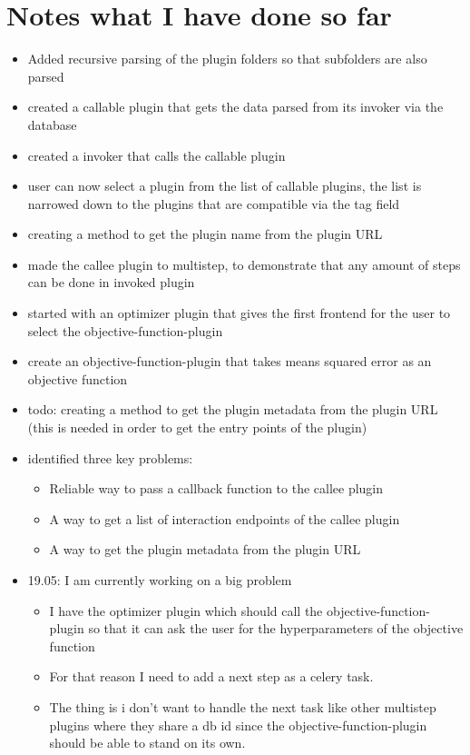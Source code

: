 \documentclass[
  a4paper,  %
  twoside,  %
  bibliography=totoc,
  headsepline,
  cleardoublepage=empty,
  parskip=half,
  draft=false
]{scrbook}
\begin{document}
\chapter{Notes what I have done so far}
\begin{itemize}
  \item Added recursive parsing of the plugin folders so that subfolders are also parsed
  \item created a callable plugin that gets the data parsed from its invoker via the database
  \item created a invoker that calls the callable plugin
  \item user can now select a plugin from the list of callable plugins, the list is narrowed down to the plugins that are compatible via the tag field
  \item creating a method to get the plugin name from the plugin URL
  \item made the callee plugin to multistep, to demonstrate that any amount of steps can be done in invoked plugin
  \item started with an optimizer plugin that gives the first frontend for the user to select the objective-function-plugin
  \item create an objective-function-plugin that takes means squared error as an objective function
  \item todo: creating a method to get the plugin metadata from the plugin URL (this is needed in order to get the entry points of the plugin)
  \item identified three key problems:
  \begin{itemize}
    \item Reliable way to pass a callback function to the callee plugin
    \item A way to get a list of interaction endpoints of the callee plugin
    \item A way to get the plugin metadata from the plugin URL
  \end{itemize}
  \item 19.05: I am currently working on a big problem
  \begin{itemize}
    \item I have the optimizer plugin which should call the objective-function-plugin so that it can ask the user for the hyperparameters of the objective function
    \item For that reason I need to add a next step as a celery task. 
    \item The thing is i don't want to handle the next task like other multistep plugins where they share a db id since the objective-function-plugin should be able to stand on its own.

\end{itemize}
\end{itemize}
\end{document}
